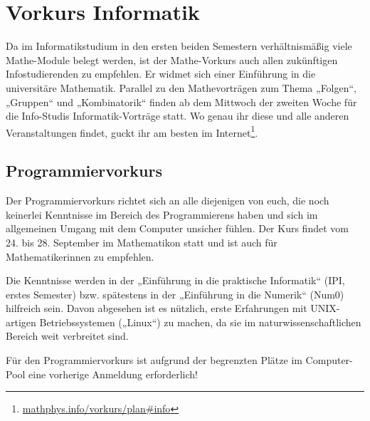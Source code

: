 \section{Vorkurs Informatik}
Da im Informatikstudium in den ersten beiden Semestern verhältnismäßig viele Mathe-Module belegt werden, ist der Mathe-Vorkurs auch allen zukünftigen Infostudierenden zu empfehlen. Er widmet sich einer Einführung in die universitäre Mathematik. 
Parallel zu den Mathevorträgen zum Thema „Folgen“, „Gruppen“ und „Kombinatorik“ finden ab dem Mittwoch der zweiten Woche für die Info-Studis Informatik-Vorträge statt. Wo genau ihr diese und alle anderen Veranstaltungen findet, guckt ihr am besten im Internet\footnote{\url{mathphys.info/vorkurs/plan\#info}}.%


\subsection{Programmiervorkurs}
Der Programmiervorkurs richtet sich an alle diejenigen von euch, die noch keinerlei Kenntnisse im Bereich des Programmierens haben und sich im allgemeinen Umgang mit dem Computer unsicher fühlen. Der Kurs findet vom 24. bis 28. September im Mathematikon statt und ist auch für Mathematikerinnen zu empfehlen.

Die Kenntnisse werden in der „Einführung in die praktische Informatik“ (\gls{IPI}, erstes Semester) bzw. spätestens in der „Einführung in die Numerik“ (\gls{Num0}) hilfreich sein. Davon abgesehen ist es nützlich, erste Erfahrungen mit UNIX-artigen Betriebssystemen („Linux“) zu machen, da sie im naturwissenschaftlichen Bereich weit verbreitet sind.

Für den Programmiervorkurs ist aufgrund der begrenzten Plätze im Computer-Pool eine vorherige Anmeldung erforderlich!
